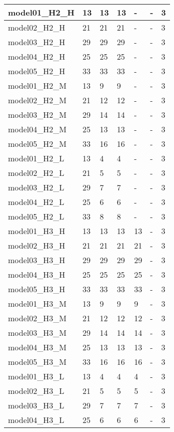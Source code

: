 \begin{longtable}{|l|l|l|l|l|l|l|}
model01\_H2\_H & 13 & 13 & 13 & - & - & 3 \\ \hline
model02\_H2\_H & 21 & 21 & 21 & - & - & 3 \\ \hline
model03\_H2\_H & 29 & 29 & 29 & - & - & 3 \\ \hline
model04\_H2\_H & 25 & 25 & 25 & - & - & 3 \\ \hline
model05\_H2\_H & 33 & 33 & 33 & - & - & 3 \\ \hline
model01\_H2\_M & 13 & 9 & 9 & - & - & 3 \\ \hline
model02\_H2\_M & 21 & 12 & 12 & - & - & 3 \\ \hline
model03\_H2\_M & 29 & 14 & 14 & - & - & 3 \\ \hline
model04\_H2\_M & 25 & 13 & 13 & - & - & 3 \\ \hline
model05\_H2\_M & 33 & 16 & 16 & - & - & 3 \\ \hline
model01\_H2\_L & 13 & 4 & 4 & - & - & 3 \\ \hline
model02\_H2\_L & 21 & 5 & 5 & - & - & 3 \\ \hline
model03\_H2\_L & 29 & 7 & 7 & - & - & 3 \\ \hline
model04\_H2\_L & 25 & 6 & 6 & - & - & 3 \\ \hline
model05\_H2\_L & 33 & 8 & 8 & - & - & 3 \\ \hline
model01\_H3\_H & 13 & 13 & 13 & 13 & - & 3 \\ \hline
model02\_H3\_H & 21 & 21 & 21 & 21 & - & 3 \\ \hline
model03\_H3\_H & 29 & 29 & 29 & 29 & - & 3 \\ \hline
model04\_H3\_H & 25 & 25 & 25 & 25 & - & 3 \\ \hline
model05\_H3\_H & 33 & 33 & 33 & 33 & - & 3 \\ \hline
model01\_H3\_M & 13 & 9 & 9 & 9 & - & 3 \\ \hline
model02\_H3\_M & 21 & 12 & 12 & 12 & - & 3 \\ \hline
model03\_H3\_M & 29 & 14 & 14 & 14 & - & 3 \\ \hline
model04\_H3\_M & 25 & 13 & 13 & 13 & - & 3 \\ \hline
model05\_H3\_M & 33 & 16 & 16 & 16 & - & 3 \\ \hline
model01\_H3\_L & 13 & 4 & 4 & 4 & - & 3 \\ \hline
model02\_H3\_L & 21 & 5 & 5 & 5 & - & 3 \\ \hline
model03\_H3\_L & 29 & 7 & 7 & 7 & - & 3 \\ \hline
model04\_H3\_L & 25 & 6 & 6 & 6 & - & 3 \\ \hline

\end{longtable}
